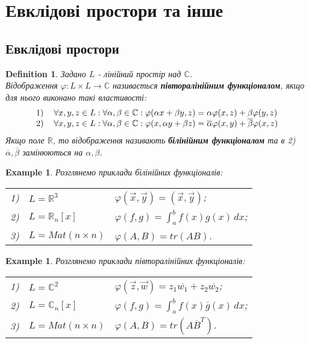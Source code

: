 \documentclass[a4paper, 10pt]{article}
\theoremstyle{theoremdd}
\newtheorem{definition}[theorem]{Definition}
\newtheorem{example}[theorem]{Example}
\begin{document}
\section{Евклідові простори та інше}
\subsection{Евклідові простори}
\begin{definition}
Задано $L$ - лінійний простір над $\mathbb{C}$.\\
Відображення $\varphi : L \times L \to \mathbb{C}$ називається \textbf{півторалінійним функціоналом}, якщо для нього виконано такі властивості:
\begin{align*}
\begin{tabular}{cl}
1) & $\forall x,y,z \in L: \forall \alpha,\beta \in \mathbb{C}: \varphi (\alpha x + \beta y, z) = \alpha \varphi (x,z) + \beta \varphi (y,z)$\\
2) & $\forall x,y,z \in L: \forall \alpha, \beta \in \mathbb{C}: \varphi (x, \alpha y + \beta z) = \overline{\alpha} \varphi (x,y) + \overline{\beta} \varphi (x,z)$\\
	\end{tabular}
\end{align*}
Якщо поле $\mathbb{R}$, то відображення називають \textbf{білінійним функціоналом} та в 2) $\overline{\alpha},\overline{\beta}$ замінюються на $\alpha,\beta$.
\end{definition}

\begin{example}
\label{bilinear_functional}
Розглянемо приклади білінійних функціоналів:\\
\begin{tabular}{cll}
1) & $L = \mathbb{R}^3$ & $\varphi(\vec{x},\vec{y}) = (\vec{x},\vec{y})$;\\
2) & $L = \mathbb{R}_n[x]$ & $\varphi(f,g) = \displaystyle \int_a^b f(x)g(x)\,dx$;\\
3) & $L = Mat(n \times n)$ & $\varphi(A,B) = tr(AB)$.
\end{tabular}

\end{example}

\begin{example}
\label{one_half_functional}
Розглянемо приклади півторалінійних функціоналів:\\
\begin{tabular}{cll}
1) & $L = \mathbb{C}^2$ & $\varphi(\vec{z},\vec{w}) = z_1 \overline{w_1} + z_2 \overline{w_2}$;\\
2) & $L = \mathbb{C}_n[x]$ & $\varphi(f,g) = \displaystyle \int_a^b f(x) \overline{g}(x)\,dx$;\\
3) & $L = Mat(n \times n)$ & $\varphi(A,B) = tr(A \overline{B}^T)$.
\end{tabular}
\end{example}
\end{document}
